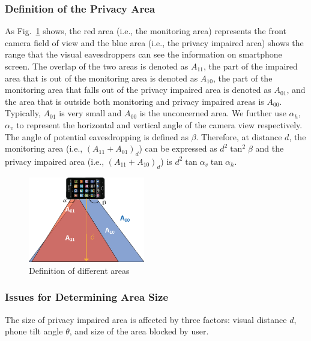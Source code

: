 \subsubsection{Definition of the Privacy Area}
As Fig.~\ref{fig:area} shows, the red area (i.e., the monitoring area) represents the front camera field of view and the blue area (i.e., the privacy impaired area) shows the range that the visual eavesdroppers can see the information on smartphone screen. The overlap of the two areas is denoted as $A_{11}$, the part of the impaired area that is out of the monitoring area is denoted as  $A_{10}$,  the part of the monitoring area that falls out of the privacy impaired area is denoted as $A_{01}$,  and the area that is outside both monitoring and privacy impaired areas is $A_{00}$. Typically, $A_{01}$ is  very small  and $A_{00}$ is the unconcerned area. We further use $\alpha_h$, $\alpha_v$ to represent the horizontal and vertical angle of the camera view respectively. The angle of potential eavesdropping is defined as $\beta$. Therefore, at  distance $d$, the monitoring area  (i.e., $(A_{11}+A_{01})_d$) can be expressed as $d^2\tan^2\beta$ and the privacy impaired area  (i.e., $(A_{11}+A_{10})_d$) is $d^2\tan\alpha_v\tan\alpha_h$.
\begin{figure}[H]
\centering
\includegraphics[width=2in]{area1.eps}
\caption{Definition of different areas }
\label{fig:area}
\end{figure}


\subsubsection{Issues for Determining Area Size}


The size of privacy impaired area is affected by three factors:  visual distance $d$,  phone  tilt angle $\theta$, and size of the area blocked by user.

